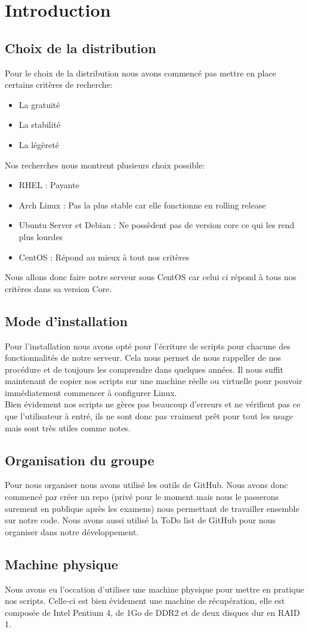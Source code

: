 \section{Introduction}
\subsection{Choix de la distribution}
Pour le choix de la distribution nous avons commencé pas mettre en place certains critères de recherche:
\begin{itemize}
	\item La gratuité
	\item La stabilité
	\item La légèreté
\end{itemize}
Nos recherches nous montrent plusieurs choix possible:
\begin{itemize}
	\item RHEL : Payante
	\item Arch Linux : Pas la plus stable car elle fonctionne en rolling release
	\item Ubuntu Server et Debian : Ne possèdent pas de version core ce qui les rend plus lourdes
	\item CentOS : Répond au mieux à tout nos critères
\end{itemize}
Nous allons donc faire notre serveur sous CentOS car celui ci répond à tous nos critères dans sa version Core.

\subsection{Mode d'installation}
Pour l'installation nous avons opté pour l'écriture de scripts pour chacune des fonctionnalités de notre serveur. Cela nous permet de nous rappeller de nos procédure et de toujours les comprendre dans quelques années.
Il nous suffit maintenant de copier nos scripts sur une machine réelle ou virtuelle pour pouvoir immédiatement commencer à configurer Linux.\\
Bien évidement nos scripts ne gères pas beaucoup d'erreurs et ne vérifient pas ce que l'utilisateur à entré, ils ne sont donc pas vraiment prêt pour tout les usage mais sont très utiles comme notes.

\subsection{Organisation du groupe}
Pour nous organiser nous avons utilisé les outils de GitHub. Nous avons donc commencé par créer un repo (privé pour le moment mais nous le passerons surement en publique après les examens) nous permettant de travailler ensemble sur notre code. Nous avons aussi utilisé la ToDo list de GitHub pour nous organiser dans notre développement.

\subsection{Machine physique}
Nous avons eu l'occation d'utiliser une machine physique pour mettre en pratique nos scripts. Celle-ci est bien évidement une machine de récupération, elle est composée de Intel Pentium 4, de 1Go de DDR2 et de deux disques dur en RAID 1.
